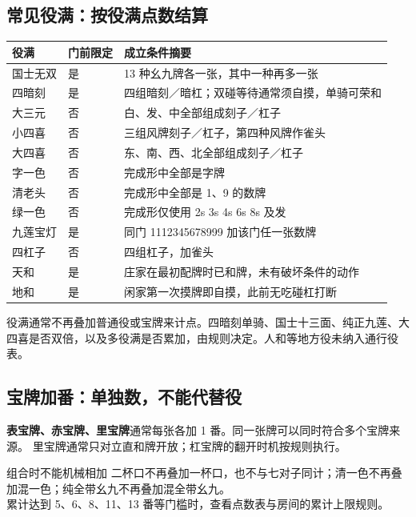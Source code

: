 \documentclass[UTF8,a4paper,zihao=5,fontset=fandol]{ctexart}
\newcommand{\smalltext}[1]{{\small\color{muted}#1}}
\newcommand{\notation}[1]{{\ttfamily\color{teal}#1}}
\begin{document}
\subsection{常见役满：按役满点数结算}
{\small
\par\noindent\begin{tabularx}{\linewidth}{L{25mm}L{15mm}Y}
\toprule
役满 & 门前限定 & 成立条件摘要\\
\midrule
国士无双 & 是 & 13 种幺九牌各一张，其中一种再多一张\\
四暗刻 & 是 & 四组暗刻／暗杠；双碰等待通常须自摸，单骑可荣和\\
大三元 & 否 & 白、发、中全部组成刻子／杠子\\
小四喜 & 否 & 三组风牌刻子／杠子，第四种风牌作雀头\\
大四喜 & 否 & 东、南、西、北全部组成刻子／杠子\\
字一色 & 否 & 完成形中全部是字牌\\
清老头 & 否 & 完成形中全部是 1、9 的数牌\\
绿一色 & 否 & 完成形仅使用 \notation{2s 3s 4s 6s 8s} 及发\\
九莲宝灯 & 是 & 同门 \notation{1112345678999} 加该门任一张数牌\\
四杠子 & 否 & 四组杠子，加雀头\\
天和 & 是 & 庄家在最初配牌时已和牌，未有破坏条件的动作\\
地和 & 是 & 闲家第一次摸牌即自摸，此前无吃碰杠打断\\
\bottomrule
\end{tabularx}\par\vspace{3pt}}
\smalltext{役满通常不再叠加普通役或宝牌来计点。四暗刻单骑、国士十三面、纯正九莲、大四喜是否双倍，以及多役满是否累加，由规则决定。人和等地方役未纳入通行役表。}

\subsection{宝牌加番：单独数，不能代替役}
\textbf{表宝牌、赤宝牌、里宝牌}通常每张各加 1 番。同一张牌可以同时符合多个宝牌来源。
里宝牌通常只对立直和牌开放；杠宝牌的翻开时机按规则执行。
\begin{note}{组合时不能机械相加}
二杯口不再叠加一杯口，也不与七对子同计；清一色不再叠加混一色；纯全带幺九不再叠加混全带幺九。\\
累计达到 5、6、8、11、13 番等门槛时，查看点数表与房间的累计上限规则。
\end{note}
\end{document}
